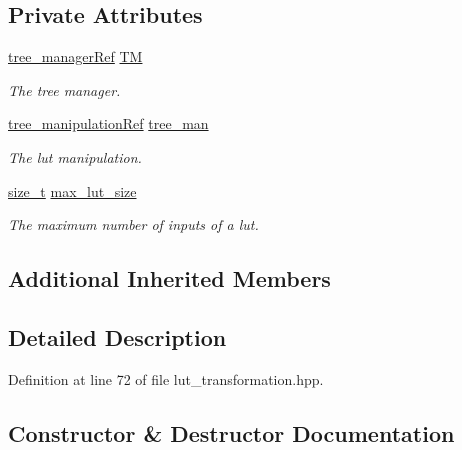 \subsection*{Private Attributes}
\begin{DoxyCompactItemize}
\item 
\hyperlink{tree__manager_8hpp_a96ff150c071ce11a9a7a1e40590f205e}{tree\+\_\+manager\+Ref} \hyperlink{classlut__transformation_a5971f226cdbed3d142f437a7ec5609a4}{TM}
\begin{DoxyCompactList}\small\item\em The tree manager. \end{DoxyCompactList}\item 
\hyperlink{tree__manipulation_8hpp_a1a9460e3a2f9fc6a96cfd2f24cc9b2a5}{tree\+\_\+manipulation\+Ref} \hyperlink{classlut__transformation_a6a64411dd9952dd7093c970a2a68e5d5}{tree\+\_\+man}
\begin{DoxyCompactList}\small\item\em The lut manipulation. \end{DoxyCompactList}\item 
\hyperlink{tutorial__fpt__2017_2intro_2sixth_2test_8c_a7c94ea6f8948649f8d181ae55911eeaf}{size\+\_\+t} \hyperlink{classlut__transformation_a8506fa3c6e958725ebd8baf8b581b37b}{max\+\_\+lut\+\_\+size}
\begin{DoxyCompactList}\small\item\em The maximum number of inputs of a lut. \end{DoxyCompactList}\end{DoxyCompactItemize}
\subsection*{Additional Inherited Members}


\subsection{Detailed Description}


Definition at line 72 of file lut\+\_\+transformation.\+hpp.



\subsection{Constructor \& Destructor Documentation}
\mbox{\label{classlut__transformation_a6bf32144886b5777cc0f22a897bb3cfe}} 

